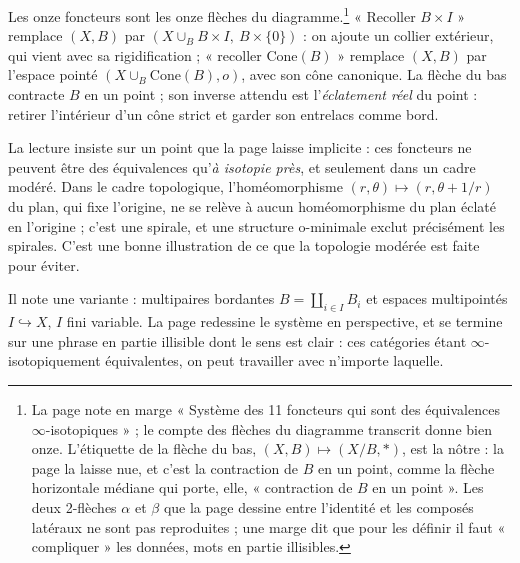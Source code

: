 \documentclass[11pt,a4paper]{article}
\begin{document}

Les onze foncteurs sont les onze flèches du diagramme.\footnote{La page note
en marge « Système des 11 foncteurs qui sont des équivalences
$\infty$-isotopiques » ; le compte des flèches du diagramme transcrit donne
bien onze. L'étiquette de la flèche du bas, $(X, B) \mapsto (X/B, *)$, est
la nôtre : la page la laisse nue, et c'est la contraction de $B$ en un point,
comme la flèche horizontale médiane qui porte, elle, « contraction de $B$ en
un point ». Les deux 2-flèches $\alpha$ et $\beta$ que la page dessine entre
l'identité et les composés latéraux ne sont pas reproduites ; une marge dit
que pour les définir il faut « compliquer » les données, mots en partie
illisibles.} « Recoller $B \times I$ » remplace $(X, B)$ par
$(X \cup_{B} B \times I,\ B \times \{0\})$ : on ajoute un collier extérieur,
qui vient avec sa rigidification ; « recoller $\mathrm{Cone}(B)$ » remplace
$(X, B)$ par l'espace pointé $(X \cup_B \mathrm{Cone}(B), o)$, avec son cône
canonique. La flèche du bas contracte $B$ en un point ; son inverse attendu
est l'\emph{éclatement réel} du point : retirer l'intérieur d'un cône strict
et garder son entrelacs comme bord.

La lecture insiste sur un point que la page laisse implicite : ces foncteurs
ne peuvent être des équivalences qu'\emph{à isotopie près}, et seulement dans
un cadre modéré. Dans le cadre topologique, l'homéomorphisme
$(r, \theta) \mapsto (r, \theta + 1/r)$ du plan, qui fixe l'origine, ne se
relève à aucun homéomorphisme du plan éclaté en l'origine ; c'est une
spirale, et une structure o-minimale exclut précisément les spirales. C'est
une bonne illustration de ce que la topologie modérée est faite pour éviter.

Il note une variante : multipaires bordantes $B = \coprod_{i \in I} B_i$ et
espaces multipointés $I \hookrightarrow X$, $I$ fini variable. La page redessine
le système en perspective, et se termine sur une phrase en partie illisible
dont le sens est clair : ces catégories étant $\infty$-isotopiquement
équivalentes, on peut travailler avec n'importe laquelle.
\end{document}
